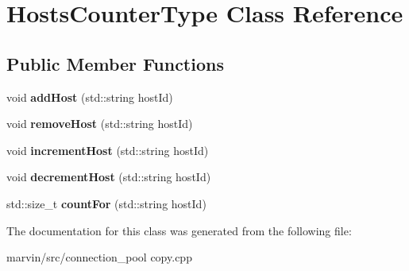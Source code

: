 \hypertarget{class_hosts_counter_type}{}\section{Hosts\+Counter\+Type Class Reference}
\label{class_hosts_counter_type}
\subsection*{Public Member Functions}
\begin{DoxyCompactItemize}
\item 
\mbox{\label{class_hosts_counter_type_aebc05d68804f01a81b856983252e0d0a}} 
void {\bfseries add\+Host} (std\+::string host\+Id)
\item 
\mbox{\label{class_hosts_counter_type_a08b1b26166abd277b8c148ad97358b58}} 
void {\bfseries remove\+Host} (std\+::string host\+Id)
\item 
\mbox{\label{class_hosts_counter_type_a573a6477d8fd2212c8a06fed98d5d87d}} 
void {\bfseries increment\+Host} (std\+::string host\+Id)
\item 
\mbox{\label{class_hosts_counter_type_a34a04f7dbd943573cd9dcc023b817962}} 
void {\bfseries decrement\+Host} (std\+::string host\+Id)
\item 
\mbox{\label{class_hosts_counter_type_a3c3cd7358d7768d983701b27d2b47d08}} 
std\+::size\+\_\+t {\bfseries count\+For} (std\+::string host\+Id)
\end{DoxyCompactItemize}


The documentation for this class was generated from the following file\+:\begin{DoxyCompactItemize}
\item 
marvin/src/connection\+\_\+pool copy.\+cpp\end{DoxyCompactItemize}
